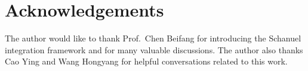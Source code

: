 \documentclass[11pt]{article}
\theoremstyle{remark}
\newcommand{\1}{\mathbf 1}
\begin{document}
\section*{Acknowledgements}

The author would like to thank Prof.\ Chen Beifang for introducing the Schanuel integration framework and for many valuable discussions.
The author also thanks Cao Ying and Wang Hongyang for helpful conversations related to this work.



\end{document}
